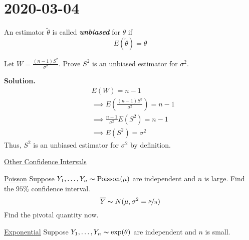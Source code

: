 \section{2020-03-04}
\begin{defbox}
    \begin{definition}
        An estimator $ \tilde{\theta} $ is called \textbf{\emph{unbiased}} for $ \theta $ if
        \[ E(\tilde{\theta})=\theta \]
    \end{definition}
\end{defbox}
\begin{exbox}
    \begin{example}
        Let $ W=\frac{(n-1)S^2}{\sigma^2} $. Prove $ S^2 $ is an unbiased
        estimator for $ \sigma^2 $.

        \textbf{Solution.}
        \begin{align*}
             & E(W)=n-1                                              \\
             & \implies E\left(\frac{(n-1)S^2}{\sigma^2} \right)=n-1 \\
             & \implies \frac{n-1}{\sigma^2} E(S^2)=n-1              \\
             & \implies E(S^2)=\sigma^2
        \end{align*}
        Thus, $ S^2 $ is an unbiased estimator for $ \sigma^2 $ by definition.
    \end{example}
\end{exbox}

\underline{Other Confidence Intervals}

\underline{Poisson}
Suppose $ Y_1,\ldots ,Y_n \thicksim \operatorname{Poisson}(\mu) $
are independent and $ n $ is large. Find the $ 95\% $ confidence interval.
\[ \overline{Y} \thicksim N(\mu,\sigma^2=\nicefrac{\mu}{n}) \]
Find the pivotal quantity now.

\underline{Exponential}
Suppose $ Y_1,\ldots ,Y_n \thicksim \exp(\theta) $ are independent and $ n $ is small.

